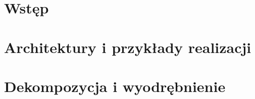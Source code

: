 \documentclass[a4paper, 10pt, twoside]{article}
\begin{document}


    
    \newpage

    
    \newpage


\begin{spacing}{1.5} %
\tableofcontents
\end{spacing}
\newpage

\listoffigures
\newpage



\section{Wstęp}


\section{Architektury i przykłady realizacji}


\section{Dekompozycja i wyodrębnienie}

\end{document}
